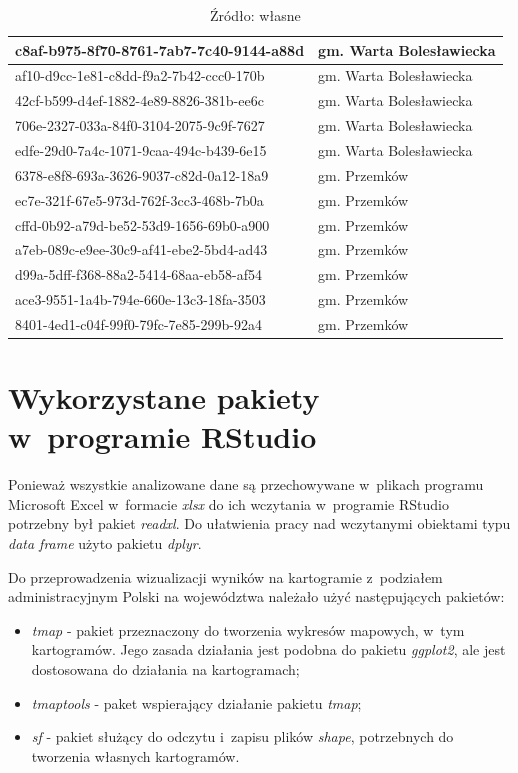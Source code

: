 \begin{table}[]
{\begin{tabular}{|l|l|}
c8af-b975-8f70-8761-7ab7-7c40-9144-a88d & gm. Warta Bolesławiecka \\ \hline
af10-d9cc-1e81-c8dd-f9a2-7b42-ccc0-170b & gm. Warta Bolesławiecka \\ \hline
42cf-b599-d4ef-1882-4e89-8826-381b-ee6c & gm. Warta Bolesławiecka \\ \hline
706e-2327-033a-84f0-3104-2075-9c9f-7627 & gm. Warta Bolesławiecka \\ \hline
edfe-29d0-7a4c-1071-9caa-494c-b439-6e15 & gm. Warta Bolesławiecka \\ \hline
6378-e8f8-693a-3626-9037-c82d-0a12-18a9 & gm. Przemków \\ \hline
ec7e-321f-67e5-973d-762f-3cc3-468b-7b0a & gm. Przemków \\ \hline
cffd-0b92-a79d-be52-53d9-1656-69b0-a900 & gm. Przemków \\ \hline
a7eb-089c-e9ee-30c9-af41-ebe2-5bd4-ad43 & gm. Przemków \\ \hline
d99a-5dff-f368-88a2-5414-68aa-eb58-af54 & gm. Przemków \\ \hline
ace3-9551-1a4b-794e-660e-13c3-18fa-3503 & gm. Przemków \\ \hline
8401-4ed1-c04f-99f0-79fc-7e85-299b-92a4 & gm. Przemków \\ \hline
\end{tabular}}
\caption*{Źródło: własne}
\end{table}


\section{Wykorzystane pakiety w~programie RStudio}

Ponieważ wszystkie analizowane dane są przechowywane w~plikach programu Microsoft Excel w~formacie
\textit{xlsx} do ich wczytania w~programie RStudio potrzebny był pakiet \textit{readxl}. Do ułatwienia pracy nad wczytanymi obiektami typu \textit{data frame} użyto pakietu \textit{dplyr}.

Do przeprowadzenia wizualizacji wyników na kartogramie z~podziałem administracyjnym Polski na województwa należało użyć następujących pakietów:
\begin{itemize}
        \item \textit{tmap} - pakiet przeznaczony do tworzenia wykresów mapowych, w~tym kartogramów. Jego zasada działania jest podobna do pakietu \textit{ggplot2}, ale jest dostosowana do działania na kartogramach;
        \item  \textit{tmaptools} - paket wspierający działanie pakietu \textit{tmap};
        \item \textit{sf} - pakiet służący do odczytu i~zapisu plików \textit{shape}, potrzebnych do tworzenia własnych kartogramów.
\end{itemize}


